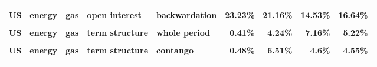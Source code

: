 \documentclass[
  authoryear,
  preprint,
  3p]{elsarticle}
\begin{document}
\begin{landscape}
\begin{longtable}[t]{>{}l>{}l>{}l>{}l>{}l>{}r>{}r>{}r>{}r}
\addlinespace
\textbf{\cellcolor{gray!10}{US}} & \textbf{\cellcolor{gray!10}{energy}} & \textbf{\cellcolor{gray!10}{gas}} & \textbf{\cellcolor{gray!10}{open interest}} & \textbf{\cellcolor{gray!10}{whole period}} & \textcolor[HTML]{4285f4}{\textbf{\cellcolor{gray!10}{22.08\%}}} & \textcolor[HTML]{4285f4}{\textbf{\cellcolor{gray!10}{27.47\%}}} & \textcolor[HTML]{4285f4}{\textbf{\cellcolor{gray!10}{15.46\%}}} & \textcolor[HTML]{4285f4}{\textbf{\cellcolor{gray!10}{16.03\%}}}\\
\textbf{US} & \textbf{energy} & \textbf{gas} & \textbf{open interest} & \textbf{backwardation} & \textcolor[HTML]{4285f4}{\textbf{23.23\%}} & \textcolor[HTML]{4285f4}{\textbf{21.16\%}} & \textcolor[HTML]{4285f4}{\textbf{14.53\%}} & \textcolor[HTML]{4285f4}{\textbf{16.64\%}}\\
\textbf{\cellcolor{gray!10}{US}} & \textbf{\cellcolor{gray!10}{energy}} & \textbf{\cellcolor{gray!10}{gas}} & \textbf{\cellcolor{gray!10}{open interest}} & \textbf{\cellcolor{gray!10}{contango}} & \textcolor[HTML]{4285f4}{\textbf{\cellcolor{gray!10}{20.54\%}}} & \textcolor[HTML]{4285f4}{\textbf{\cellcolor{gray!10}{32.65\%}}} & \textcolor[HTML]{4285f4}{\textbf{\cellcolor{gray!10}{16.18\%}}} & \textcolor[HTML]{4285f4}{\textbf{\cellcolor{gray!10}{15.41\%}}}\\
\textbf{US} & \textbf{energy} & \textbf{gas} & \textbf{term structure} & \textbf{whole period} & \textcolor[HTML]{4285f4}{\textbf{0.41\%}} & \textcolor[HTML]{4285f4}{\textbf{4.24\%}} & \textcolor[HTML]{4285f4}{\textbf{7.16\%}} & \textcolor[HTML]{4285f4}{\textbf{5.22\%}}\\
\textbf{\cellcolor{gray!10}{US}} & \textbf{\cellcolor{gray!10}{energy}} & \textbf{\cellcolor{gray!10}{gas}} & \textbf{\cellcolor{gray!10}{term structure}} & \textbf{\cellcolor{gray!10}{backwardation}} & \textcolor[HTML]{4285f4}{\textbf{\cellcolor{gray!10}{0.36\%}}} & \textcolor[HTML]{4285f4}{\textbf{\cellcolor{gray!10}{2.03\%}}} & \textcolor[HTML]{4285f4}{\textbf{\cellcolor{gray!10}{11.66\%}}} & \textcolor[HTML]{4285f4}{\textbf{\cellcolor{gray!10}{5.9\%}}}\\
\addlinespace
\textbf{US} & \textbf{energy} & \textbf{gas} & \textbf{term structure} & \textbf{contango} & \textcolor[HTML]{4285f4}{\textbf{0.48\%}} & \textcolor[HTML]{4285f4}{\textbf{6.51\%}} & \textcolor[HTML]{4285f4}{\textbf{4.6\%}} & \textcolor[HTML]{4285f4}{\textbf{4.55\%}}\\
\textbf{\cellcolor{gray!10}{US}} & \textbf{\cellcolor{gray!10}{energy}} & \textbf{\cellcolor{gray!10}{petroleum}} & \textbf{\cellcolor{gray!10}{market}} & \textbf{\cellcolor{gray!10}{whole period}} & \textcolor[HTML]{4285f4}{\textbf{\cellcolor{gray!10}{28.98\%}}} & \textcolor[HTML]{4285f4}{\textbf{\cellcolor{gray!10}{35.97\%}}} & \textcolor[HTML]{4285f4}{\textbf{\cellcolor{gray!10}{48.3\%}}} & \textcolor[HTML]{4285f4}{\textbf{\cellcolor{gray!10}{31.91\%}}}\\

\end{longtable}
\end{landscape}
\end{document}
